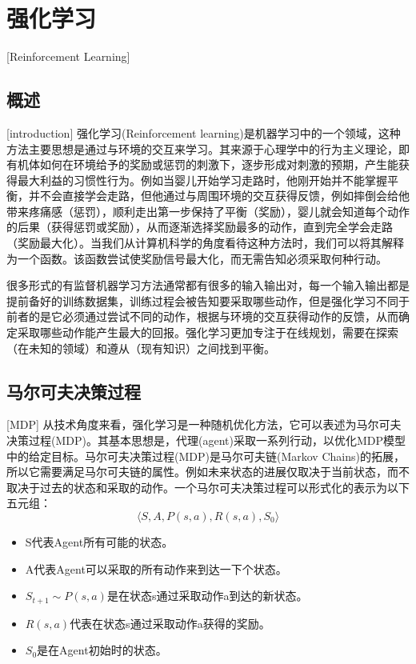 \section{强化学习}[Reinforcement Learning]
\subsection{概述}[introduction]
强化学习(Reinforcement learning)\cite{RLIntroduction}是机器学习中的一个领域，这种方法主要思想是通过与环境的交互来学习。其来源于心理学中的行为主义理论，即有机体如何在环境给予的奖励或惩罚的刺激下，逐步形成对刺激的预期，产生能获得最大利益的习惯性行为。例如当婴儿开始学习走路时，他刚开始并不能掌握平衡，并不会直接学会走路，但他通过与周围环境的交互获得反馈，例如摔倒会给他带来疼痛感（惩罚），顺利走出第一步保持了平衡（奖励），婴儿就会知道每个动作的后果（获得惩罚或奖励），从而逐渐选择奖励最多的动作，直到完全学会走路（奖励最大化）。当我们从计算机科学的角度看待这种方法时，我们可以将其解释为一个函数。该函数尝试使奖励信号最大化，而无需告知必须采取何种行动。

很多形式的有监督机器学习方法通常都有很多的输入输出对，每一个输入输出都是提前备好的训练数据集，训练过程会被告知要采取哪些动作，但是强化学习不同于前者的是它必须通过尝试不同的动作，根据与环境的交互获得动作的反馈，从而确定采取哪些动作能产生最大的回报。强化学习更加专注于在线规划，需要在探索（在未知的领域）和遵从（现有知识）之间找到平衡。

\subsection{马尔可夫决策过程}[MDP]
从技术角度来看，强化学习是一种随机优化方法，它可以表述为马尔可夫决策过程(MDP)\cite{MDP}。其基本思想是，代理(agent)采取一系列行动，以优化MDP模型中的给定目标。马尔可夫决策过程(MDP)是马尔可夫链(Markov Chains)的拓展，所以它需要满足马尔可夫链的属性。例如未来状态的进展仅取决于当前状态，而不取决于过去的状态和采取的动作。一个马尔可夫决策过程可以形式化的表示为以下五元组：
\begin{equation}\label{MDP5}
\langle S, A, P(s,a),R(s,a),S_0 \rangle
\end{equation}
\begin{itemize}
    \item S代表Agent所有可能的状态。
    \item A代表Agent可以采取的所有动作来到达一下个状态。
    \item $S_{t+1}\sim P(s,a)$是在状态s通过采取动作a到达的新状态。
    \item $R(s,a)$代表在状态s通过采取动作a获得的奖励。
    \item $S_0$是在Agent初始时的状态。
\end{itemize}

